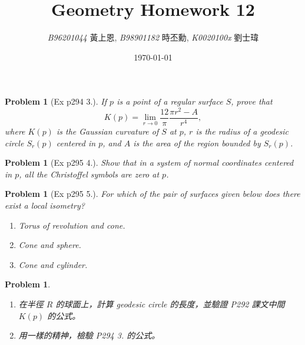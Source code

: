\documentclass[10pt,a4paper]{article}
\newcommand{\LiHei}{\CJKfamily{lh}}
\newcounter{theProblemCounter}
\newtheorem{problem}[theProblemCounter]{Problem}
\begin{document}
\title{{Geometry Homework 12}}
\author{{\it{B96201044}} {\LiHei 黃上恩}, {\it{B98901182}} {\LiHei 時丕勳}, {\it{K0020100x}} {\LiHei 劉士瑋}}
\date{\today}
\maketitle

\newcommand{\bx}{\mathbb{X}}
\newcommand{\bfx}{\mathbf{x}}
\newcommand{\grad}{\textrm{grad }}
\newcommand{\sech}{\mbox{sech}}

\setcounter{theProblemCounter}{2}
\begin{problem}[Ex p294 3.]
If $p$ is a point of a regular surface $S$, prove that \[ K(p) = \lim_{r\to 0}\frac{12}{\pi}\frac{\pi r^2-A}{r^4}, \] where $K(p)$ is the Gaussian curvature of $S$ at $p$, $r$ is the radius of a geodesic circle $S_r(p)$ centered in $p$, and $A$ is the area of the region bounded by $S_r(p)$.
\end{problem}

\setcounter{theProblemCounter}{3}
\begin{problem}[Ex p295 4.]
Show that in a system of normal coordinates centered in $p$, all the Christoffel symbols are zero at $p$.
\end{problem}

\setcounter{theProblemCounter}{4}
\begin{problem}[Ex p295 5.]
For which of the pair of surfaces given below does there exist a local isometry?
\begin{enumerate}
\item[(a)] Torus of revolution and cone.
\item[(b)] Cone and sphere.
\item[(c)] Cone and cylinder.
\end{enumerate}
\end{problem}

\setcounter{theProblemCounter}{7}
\begin{problem}\hspace*{1em}
\begin{enumerate}
\item[(a)] 在半徑 $R$ 的球面上，計算 geodesic circle 的長度，並驗證 P292 課文中間 $K(p)$ 的公式。
\item[(b)] 用一樣的精神，檢驗 P294 3. 的公式。
\end{enumerate}
\end{problem}
\end{document}
